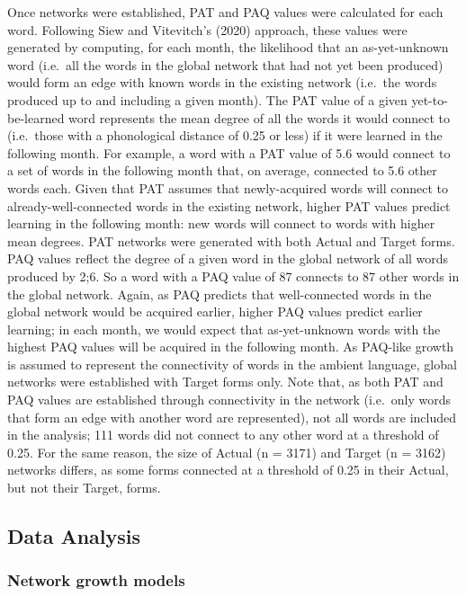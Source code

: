 \documentclass[
  man,mask,floatsintext]{apa6}
\begin{document}
Once networks were established, PAT and PAQ values were calculated for each word. Following Siew and Vitevitch's (2020) approach, these values were generated by computing, for each month, the likelihood that an as-yet-unknown word (i.e.~all the words in the global network that had not yet been produced) would form an edge with known words in the existing network (i.e.~the words produced up to and including a given month). The PAT value of a given yet-to-be-learned word represents the mean degree of all the words it would connect to (i.e.~those with a phonological distance of 0.25 or less) if it were learned in the following month. For example, a word with a PAT value of 5.6 would connect to a set of words in the following month that, on average, connected to 5.6 other words each. Given that PAT assumes that newly-acquired words will connect to already-well-connected words in the existing network, higher PAT values predict learning in the following month: new words will connect to words with higher mean degrees. PAT networks were generated with both Actual and Target forms. PAQ values reflect the degree of a given word in the global network of all words produced by 2;6. So a word with a PAQ value of 87 connects to 87 other words in the global network. Again, as PAQ predicts that well-connected words in the global network would be acquired earlier, higher PAQ values predict earlier learning; in each month, we would expect that as-yet-unknown words with the highest PAQ values will be acquired in the following month. As PAQ-like growth is assumed to represent the connectivity of words in the ambient language, global networks were established with Target forms only. Note that, as both PAT and PAQ values are established through connectivity in the network (i.e.~only words that form an edge with another word are represented), not all words are included in the analysis; 111 words did not connect to any other word at a threshold of 0.25. For the same reason, the size of Actual (n = 3171) and Target (n = 3162) networks differs, as some forms connected at a threshold of 0.25 in their Actual, but not their Target, forms.

\hypertarget{data-analysis}{%
\subsection{Data Analysis}\label{data-analysis}}

\hypertarget{network-growth-models}{%
\subsubsection{Network growth models}\label{network-growth-models}}
\end{document}
